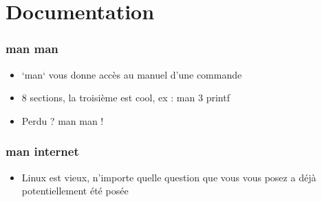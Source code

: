 \section{Documentation}

\begin{frame}
    \frametitle{man man}
    \begin{itemize}
	    \item `man` vous donne accès au manuel d'une commande
	    \item 8 sections, la troisième est cool, ex : man 3 printf
        \item Perdu ? man man !
    \end{itemize}
\end{frame}

\begin{frame}
    \frametitle{man internet}
    \begin{itemize}
	\item Linux est vieux, n'importe quelle question que vous vous posez a
            déjà potentiellement été posée
    \end{itemize}
\end{frame}
